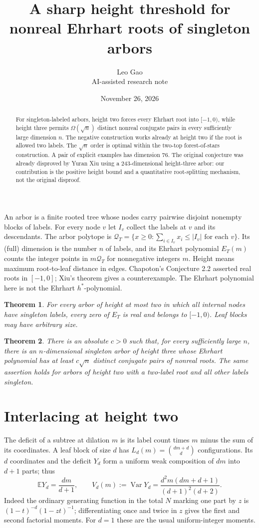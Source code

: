 \documentclass[11pt]{article}
\title{A sharp height threshold for nonreal Ehrhart roots of singleton arbors}
\author{Leo Gao\\{\small AI-assisted research note}}
\date{November 26, 2026}
\newtheorem{thm}{Theorem}
\newcommand{\E}{\mathbb E}
\newcommand{\Q}{\mathcal Q}
\begin{document}
\maketitle
\begin{abstract}
For singleton-labeled arbors, height two forces every Ehrhart root into
$[-1,0)$, while height three permits $\Omega(\sqrt n)$ distinct nonreal
conjugate pairs in every sufficiently large dimension $n$. The negative
construction works already at height two if the root is allowed two labels.
The $\sqrt n$ order is optimal within the two-top forest-of-stars construction. A pair of explicit examples has dimension 76. The original conjecture was
already disproved by Yuran Xiu using a 243-dimensional height-three arbor:
our contribution is the positive height bound and a quantitative
root-splitting mechanism, not the original disproof.
\end{abstract}

An arbor is a finite rooted tree whose nodes carry pairwise disjoint
nonempty blocks of labels. For every node $v$ let $I_v$ collect the labels
at $v$ and its descendants. The arbor polytope is
$\Q_T=\{x\ge0:\sum_{i\in I_v}x_i\le |I_v|\text{ for each }v\}$.
Its (full) dimension is the number $n$ of labels, and its Ehrhart
polynomial $E_T(m)$ counts the integer points in $m\Q_T$ for nonnegative
integers $m$. Height means maximum root-to-leaf distance in edges.
Chapoton's Conjecture 2.2 \cite{chap} asserted real roots in $[-1,0]$;
Xiu's theorem \cite{xiu} gives a counterexample. The Ehrhart polynomial
here is not the Ehrhart $h^*$-polynomial.

\begin{thm}\label{positive}
For every arbor of height at most two in which all internal nodes have
singleton labels, every zero of $E_T$ is real and belongs to $[-1,0)$.
Leaf blocks may have arbitrary size.
\end{thm}

\begin{thm}\label{many}
There is an absolute $c>0$ such that, for every sufficiently large $n$,
there is an $n$-dimensional singleton arbor of height three whose
Ehrhart polynomial has at least $c\sqrt n$ distinct conjugate pairs
of nonreal roots. The same assertion holds for arbors of height two with
a two-label root and all other labels singleton.
\end{thm}

\section{Interlacing at height two}
The deficit of a subtree at dilation $m$ is its label count times $m$
minus the sum of its coordinates. A leaf block of size $d$ has
$L_d(m)=\binom{dm+d}{d}$ configurations. Its $d$ coordinates
and the deficit $Y_d$ form a uniform weak composition of $dm$ into
$d+1$ parts; thus
\[
 \E Y_d=\frac{dm}{d+1},\qquad
 V_d(m):=\operatorname{Var}Y_d=
 \frac{d^2 m(dm+d+1)}{(d+1)^2(d+2)} .
\]
Indeed the ordinary generating function in the total $N$ marking one
part by $z$ is $(1-t)^{-d}(1-zt)^{-1}$; differentiating once and twice
in $z$ gives the first and second factorial moments. For $d=1$ these are
the usual uniform-integer moments.
\end{document}
